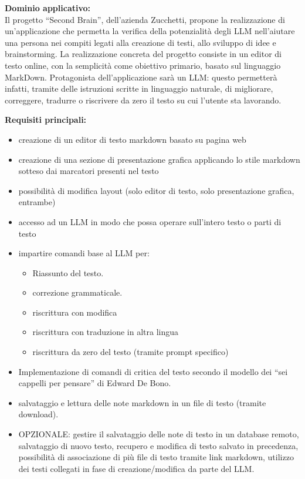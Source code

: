 \textbf{Dominio applicativo:} \\
{Il progetto “Second Brain”, dell’azienda Zucchetti, propone la realizzazione di un’applicazione che permetta la verifica della potenzialità degli LLM nell’aiutare una persona nei compiti legati alla creazione di testi, allo sviluppo di idee e brainstorming. La realizzazione concreta del progetto consiste in un editor di testo online, con la semplicità come obiettivo primario, basato sul linguaggio MarkDown. Protagonista dell’applicazione sarà un LLM: questo permetterà infatti, tramite delle istruzioni scritte in linguaggio naturale, di migliorare, correggere, tradurre o riscrivere da zero il testo su cui l’utente sta lavorando.}

\vspace{0.3cm}
\textbf{Requisiti principali:}
\begin{itemize}
	\item {creazione di un editor di testo markdown basato su pagina web}
	\item {creazione di una sezione di presentazione grafica applicando lo stile markdown sotteso dai marcatori presenti nel testo}
    \item possibilità di modifica layout (solo editor di testo, solo presentazione grafica, entrambe)
    \item accesso ad un LLM in modo che possa operare sull’intero testo o parti di testo
    \item impartire comandi base al LLM per:
        \begin{itemize}
            \item Riassunto del testo.
            \item correzione grammaticale.
            \item riscrittura con modifica
            \item riscrittura con traduzione in altra lingua
            \item riscrittura da zero del testo (tramite prompt specifico)
        \end{itemize}
\item Implementazione di comandi di critica del testo secondo il modello dei “sei cappelli per pensare” di Edward De Bono.
\item salvataggio e lettura delle note markdown in un file di testo (tramite download).
\item OPZIONALE: gestire il salvataggio delle note di testo in un database remoto, salvataggio di nuovo testo, recupero e modifica di testo salvato in precedenza, possibilità di associazione di più file di testo tramite link markdown, utilizzo dei testi collegati in fase di creazione/modifica da parte del LLM.
\end{itemize}

